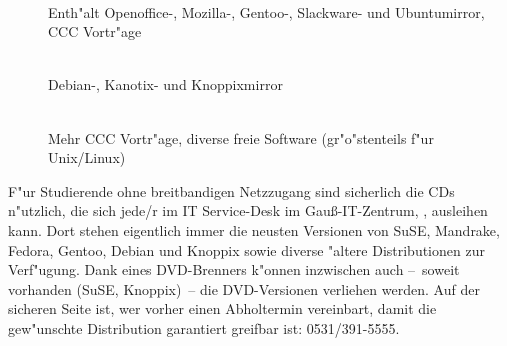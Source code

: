 \begin{description}
\item[]~\\Enth"alt Openoffice-, Mozilla-,
Gentoo-, Slackware- und Ubuntumirror, CCC Vortr"age
\item[]~\\Debian-, Kanotix- und Knoppixmirror
\item[]~\\Mehr CCC Vortr"age, diverse freie
Software (gr"o"stenteils f"ur Unix/Linux)
\end{description}
F"ur Studierende ohne breitbandigen Netzzugang sind sicherlich die CDs 
n"utzlich, die sich jede/r im
IT Service-Desk
im Gauß-IT-Zentrum, , ausleihen kann. Dort stehen eigentlich
immer die neusten Versionen von SuSE, Mandrake, Fedora, Gentoo, Debian und Knoppix
sowie diverse "altere Distributionen zur Verf"ugung. Dank eines DVD-Brenners
k"onnen inzwischen auch --~soweit vorhanden (SuSE, Knoppix)~-- die
DVD-Versionen verliehen werden. Auf der sicheren Seite ist, wer vorher einen
Abholtermin vereinbart, damit die gew"unschte Distribution garantiert greifbar
ist: 0531/391-5555.
